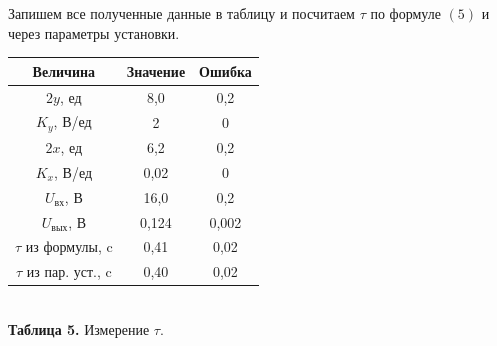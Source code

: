 \documentclass[a4paper, 12pt]{article}%
\begin{document}
	Запишем все полученные данные в таблицу и посчитаем $\tau$ по формуле $(5)$ и через параметры установки.
	\begin{center}
		\begin{tabular}{|c|c|c|}
			\hline
			Величина & Значение & Ошибка \\ \hline
			$2y$, ед & 8,0 & 0,2 \\ \hline
			$K_y$, В/ед & 2 & 0 \\ \hline
			$2x$, ед & 6,2 & 0,2 \\ \hline
			$K_x$, В/ед & 0,02 & 0 \\ \hline
			$U_{\text{вх}}$, В & 16,0 & 0,2 \\ \hline
			$U_{\text{вых}}$, В & 0,124 & 0,002 \\ \hline
			$\tau$ из формулы, c & 0,41 & 0,02 \\ \hline
			$\tau$ из пар. уст., c & 0,40 & 0,02 \\ \hline
		\end{tabular}\\
		\textbf{Таблица 5.} Измерение $\tau$.
	\end{center}
\end{document}
